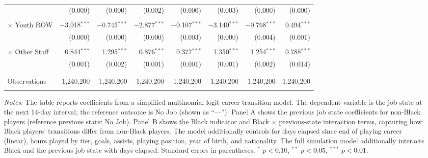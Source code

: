 \begin{table}[!h]
{\begin{threeparttable}
\begin{tabular}{lrrrrrrr}
  & (0.000) & (0.000) & (0.002) & (0.000) & (0.003) & (0.000) & (0.000) \\
 & & & & & & & \\
\quad $\times$ Youth ROW & $-$3.018$^{***}$ & $-$0.745$^{***}$ & $-$2.877$^{***}$ & $-$0.107$^{***}$ & $-$3.140$^{***}$ & $-$0.768$^{***}$ & 0.494$^{***}$ \\
  & (0.000) & (0.000) & (0.000) & (0.003) & (0.000) & (0.004) & (0.001) \\
 & & & & & & & \\
\quad $\times$ Other Staff & 0.844$^{***}$ & 1.295$^{***}$ & 0.876$^{***}$ & 0.377$^{***}$ & 1.350$^{***}$ & 1.254$^{***}$ & 0.788$^{***}$ \\
  & (0.001) & (0.002) & (0.001) & (0.001) & (0.001) & (0.002) & (0.014) \\
 & & & & & & & \\
\hline \\[-1.8ex]
Observations & 1,240,200 & 1,240,200 & 1,240,200 & 1,240,200 & 1,240,200 & 1,240,200 & 1,240,200 \\
\hline
\hline \\[-1.8ex]
\end{tabular}
\begin{tablenotes}[flushleft]
\item[] \scriptsize \textit{Notes:} The table reports coefficients from a simplified multinomial logit career transition model. The dependent variable is the job state at the next 14-day interval; the reference outcome is No Job (shown as ``---''). Panel A shows the previous job state coefficients for non-Black players (reference previous state: No Job). Panel B shows the Black indicator and Black $\times$ previous-state interaction terms, capturing how Black players' transitions differ from non-Black players. The model additionally controls for days elapsed since end of playing career (linear), hours played by tier, goals, assists, playing position, year of birth, and nationality. The full simulation model additionally interacts Black and the previous job state with days elapsed. Standard errors in parentheses. $^{*}$ $p<0.10$, $^{**}$ $p<0.05$, $^{***}$ $p<0.01$.
\end{tablenotes}
\end{threeparttable}
}
\end{table}
